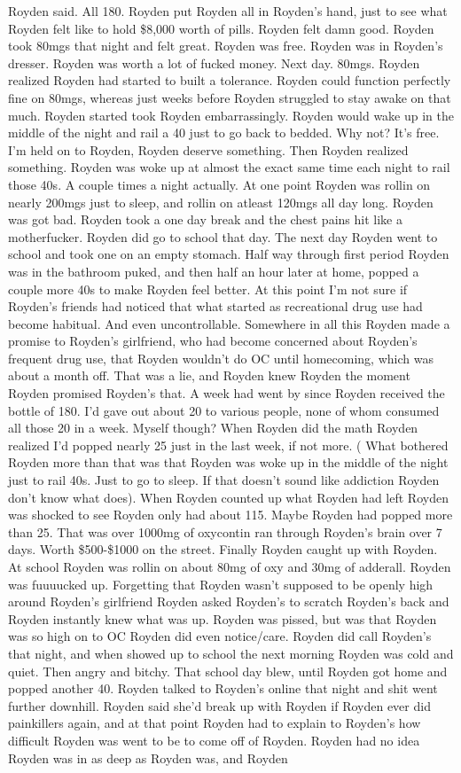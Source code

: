 \documentclass[12pt]{book}
\begin{document}
Royden said. All 180. Royden put Royden all in Royden's hand, just to see what Royden felt like to hold \$8,000 worth of pills. Royden felt damn good. Royden took 80mgs that night and felt great. Royden was free. Royden was in Royden's dresser. Royden was worth a lot of fucked money. Next day. 80mgs. Royden realized Royden had started to built a tolerance. Royden could function perfectly fine on 80mgs, whereas just weeks before Royden struggled to stay awake on that much. Royden started took Royden embarrassingly. Royden would wake up in the middle of the night and rail a 40 just to go back to bedded. Why not? It's free. I'm held on to Royden, Royden deserve something. Then Royden realized something. Royden was woke up at almost the exact same time each night to rail those 40s. A couple times a night actually. At one point Royden was rollin on nearly 200mgs just to sleep, and rollin on atleast 120mgs all day long. Royden was got bad. Royden took a one day break and the chest pains hit like a motherfucker. Royden did go to school that day. The next day Royden went to school and took one on an empty stomach. Half way through first period Royden was in the bathroom puked, and then half an hour later at home, popped a couple more 40s to make Royden feel better. At this point I'm not sure if Royden's friends had noticed that what started as recreational drug use had become habitual. And even uncontrollable. Somewhere in all this Royden made a promise to Royden's girlfriend, who had become concerned about Royden's frequent drug use, that Royden wouldn't do OC until homecoming, which was about a month off. That was a lie, and Royden knew Royden the moment Royden promised Royden's that. A week had went by since Royden received the bottle of 180. I'd gave out about 20 to various people, none of whom consumed all those 20 in a week. Myself though? When Royden did the math Royden realized I'd popped nearly 25 just in the last week, if not more. ( What bothered Royden more than that was that Royden was woke up in the middle of the night just to rail 40s. Just to go to sleep. If that doesn't sound like addiction Royden don't know what does). When Royden counted up what Royden had left Royden was shocked to see Royden only had about 115. Maybe Royden had popped more than 25. That was over 1000mg of oxycontin ran through Royden's brain over 7 days. Worth \$500-\$1000 on the street. Finally Royden caught up with Royden. At school Royden was rollin on about 80mg of oxy and 30mg of adderall. Royden was fuuuucked up. Forgetting that Royden wasn't supposed to be openly high around Royden's girlfriend Royden asked Royden's to scratch Royden's back and Royden instantly knew what was up. Royden was pissed, but was that Royden was so high on to OC Royden did even notice/care. Royden did call Royden's that night, and when showed up to school the next morning Royden was cold and quiet. Then angry and bitchy. That school day blew, until Royden got home and popped another 40. Royden talked to Royden's online that night and shit went further downhill. Royden said she'd break up with Royden if Royden ever did painkillers again, and at that point Royden had to explain to Royden's how difficult Royden was went to be to come off of Royden. Royden had no idea Royden was in as deep as Royden was, and Royden 
\end{document}
